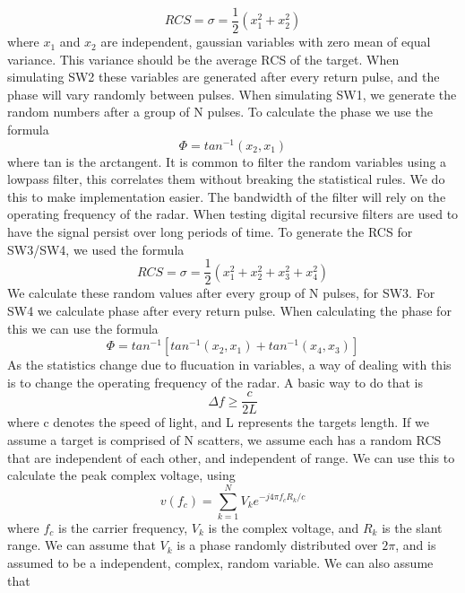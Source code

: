 \documentclass[12pt]{article}
\begin{document}
\begin{equation}
    RCS = \sigma = \frac{1}{2} \left( x_1^2 + x_2^2 \right)
\end{equation}
where $x_1$ and $x_2$ are independent, gaussian variables with zero mean of equal variance. This variance should be the average RCS of the target. When simulating SW2 these variables are generated after every return pulse, and the phase will vary randomly between pulses. When simulating SW1, we generate the random numbers after a group of N pulses. To calculate the phase we use the formula
\begin{equation}
    \Phi = tan^{-1} (x_2, x_1)
\end{equation}
where tan is the arctangent. It is common to filter the random variables using a lowpass filter, this correlates them without breaking the statistical rules. We do this to make implementation easier. The bandwidth of the filter will rely on the operating frequency of the radar. When testing digital recursive filters are used to have the signal persist over long periods of time.
To generate the RCS for SW3/SW4, we used the formula
\begin{equation}
    RCS = \sigma = \frac{1}{2} \left( x_1^2 + x_2^2 +  x_3^2 + x_4^2 \right)
\end{equation}
We calculate these random values after every group of N pulses, for SW3. For SW4 we calculate phase after every return pulse. When calculating the phase for this we can use the formula
\begin{equation}
    \Phi = tan^{-1} \left[ tan^{-1} (x_2, x_1) + tan^{-1} (x_4, x_3)   \right]
\end{equation}
As the statistics change due to flucuation in variables, a way of dealing with this is to change the operating frequency of the radar. A basic way to do that is 
\begin{equation}
    \Delta f \geq \frac{c}{2L} 
\end{equation}
where c denotes the speed of light, and L represents the targets length. If we assume a target is comprised of N scatters, we assume each has a random RCS that are independent of each other, and independent of range. We can use this to calculate the peak complex voltage, using 
\begin{equation}
    v(f_c) = \sum_{k=1}^{N} V_k e^{-j4\pi f_c R_k / c}
\end{equation}
where $f_c$ is the carrier frequency, $V_k$ is the complex voltage, and $R_k$ is the slant range. We can assume that $V_k$ is a phase randomly distributed over $2\pi$, and is assumed to be a independent, complex, random variable. We can also assume that 
\end{document}
